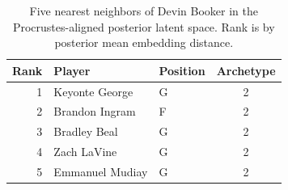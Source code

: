 \begin{table}[htbp]
  \centering\small
  \begin{tabular}{rllc}
    \toprule
    Rank & Player & Position & Archetype \\
    \midrule
    1 & Keyonte George & G & 2 \\
    2 & Brandon Ingram & F & 2 \\
    3 & Bradley Beal & G & 2 \\
    4 & Zach LaVine & G & 2 \\
    5 & Emmanuel Mudiay & G & 2 \\
    \bottomrule
  \end{tabular}
  \caption{Five nearest neighbors of Devin Booker in the Procrustes-aligned posterior latent space. Rank is by posterior mean embedding distance.}
  \label{tab:Devin_Booker_neighbors}
\end{table}

